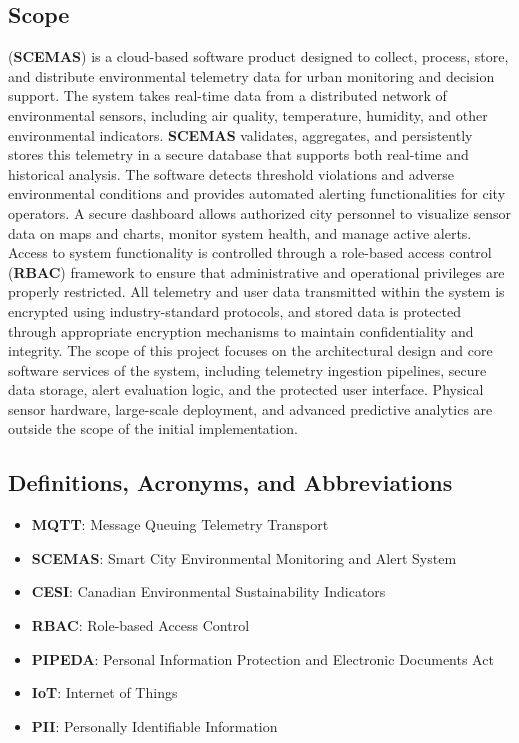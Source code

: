 \documentclass[]{article}
\begin{document}
\subsection{Scope}
\label{sub:scope}
(\textbf{SCEMAS}) is a cloud-based software product designed to collect, process, store, and distribute environmental telemetry data for urban monitoring and decision support. The system takes real-time data from a distributed network of environmental sensors, including air quality, temperature, humidity, and other environmental indicators. \textbf{SCEMAS} validates, aggregates, and persistently stores this telemetry in a secure database that supports both real-time and historical analysis. The software detects threshold violations and adverse environmental conditions and provides automated alerting functionalities for city operators. A secure dashboard allows authorized city personnel to visualize sensor data on maps and charts, monitor system health, and manage active alerts. Access to system functionality is controlled through a role-based access control (\textbf{RBAC}) framework to ensure that administrative and operational privileges are properly restricted. All telemetry and user data transmitted within the system is encrypted using industry-standard protocols, and stored data is protected through appropriate encryption mechanisms to maintain confidentiality and integrity. The scope of this project focuses on the architectural design and core software services of the system, including telemetry ingestion pipelines, secure data storage, alert evaluation logic, and the protected user interface. Physical sensor hardware, large-scale deployment, and advanced predictive analytics are outside the scope of the initial implementation.

\subsection{Definitions, Acronyms, and Abbreviations}
\label{sub:definitions_acronyms_and_abbreviations}
\begin{itemize}

	\item \textbf{MQTT}: Message Queuing Telemetry Transport
	\item \textbf{SCEMAS}: Smart City Environmental Monitoring and Alert System 
    \item \textbf{CESI}: Canadian Environmental Sustainability Indicators
    \item \textbf{RBAC}: Role-based Access Control
    \item \textbf{PIPEDA}: Personal Information Protection and Electronic Documents Act
    \item \textbf{IoT}: Internet of Things
    \item \textbf{PII}: Personally Identifiable Information

\end{itemize}
\end{document}
